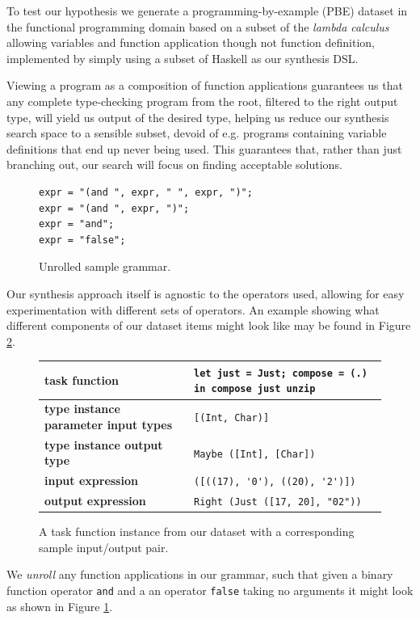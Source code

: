 \documentclass{article} %
\begin{document}
To test our hypothesis we generate a programming-by-example (PBE) dataset in the functional programming domain
based on a subset of the \emph{lambda calculus}~\citep{church1940formulation}
allowing variables and function application though not function definition,
implemented by simply using a subset of Haskell as our synthesis DSL.

Viewing a program as a composition of function applications guarantees us that any complete type-checking program from the root,
filtered to the right output type, will yield us output of the desired type,
helping us reduce our synthesis search space to a sensible subset,
devoid of e.g. programs containing variable definitions that end up never being used.
This guarantees that, rather than just branching out,
our search will focus on finding acceptable solutions.

\begin{figure}
    \vspace{-20pt}
    \begin{verbatim}
expr = "(and ", expr, " ", expr, ")";
expr = "(and ", expr, ")";
expr = "and";
expr = "false";
    \end{verbatim}
    \vspace{-25pt}
    \caption{Unrolled sample grammar.}
    \label{fig:dsl}
    \vspace{-15pt}
\end{figure}

Our synthesis approach itself is agnostic to the operators used,
allowing for easy experimentation with different sets of operators.
%
An example showing what different components of our dataset items might look like may be found in Figure \ref{fig:datasample}.
%
\begin{figure}
    \vspace{-25pt}
    \begin{tabular}{|l|l|} \hline
        \textbf{task function} & \verb|let just = Just; compose = (.) in compose just unzip| \\ \hline
        \textbf{type instance parameter input types} & \verb|[(Int, Char)]| \\ \hline
        \textbf{type instance output type} & \verb|Maybe ([Int], [Char])| \\ \hline
        \textbf{input expression} & \verb|([((17), '0'), ((20), '2')])| \\ \hline
        \textbf{output expression} & \verb|Right (Just ([17, 20], "02"))| \\ \hline
    \end{tabular}
    \vspace{-10pt}
    \caption{A task function instance from our dataset with a corresponding sample input/output pair.}
    \label{fig:datasample}
    \vspace{-15pt}
\end{figure}
%
We \emph{unroll} any function applications in our grammar, such that given a binary function operator \verb|and| and a an operator \verb|false| taking no arguments it might look as shown in Figure \ref{fig:dsl}.
\end{document}
